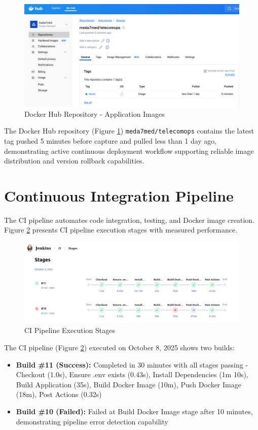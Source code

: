 \begin{figure}[H]
    \centering
    \includegraphics[width=0.95\linewidth]{img/chap_08/dockerhub.png}
    \caption{Docker Hub Repository - Application Images}
    \label{fig:dockerhub}
\end{figure}

The Docker Hub repository (Figure \ref{fig:dockerhub}) \texttt{meda7med/telecomops} contains the latest tag pushed 5 minutes before capture and pulled less than 1 day ago, demonstrating active continuous deployment workflow supporting reliable image distribution and version rollback capabilities.

\section{Continuous Integration Pipeline}

The CI pipeline automates code integration, testing, and Docker image creation. Figure \ref{fig:ci_pipeline} presents CI pipeline execution stages with measured performance.

\begin{figure}[H]
    \centering
    \includegraphics[width=0.95\linewidth]{img/chap_08/ci.png}
    \caption{CI Pipeline Execution Stages}
    \label{fig:ci_pipeline}
\end{figure}

The CI pipeline (Figure \ref{fig:ci_pipeline}) executed on October 8, 2025 shows two builds:
\begin{itemize}
\item \textbf{Build \#11 (Success):} Completed in 30 minutes with all stages passing - Checkout (1.0s), Ensure .env exists (0.43s), Install Dependencies (1m 10s), Build Application (35s), Build Docker Image (10m), Push Docker Image (18m), Post Actions (0.32s)
\item \textbf{Build \#10 (Failed):} Failed at Build Docker Image stage after 10 minutes, demonstrating pipeline error detection capability
\end{itemize}

